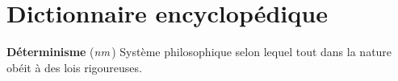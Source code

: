 
\section{Dictionnaire encyclopédique}

{\bf Déterminisme} ({\it nm}\,) Système philosophique selon lequel tout dans la nature obéit à des lois rigoureuses.

